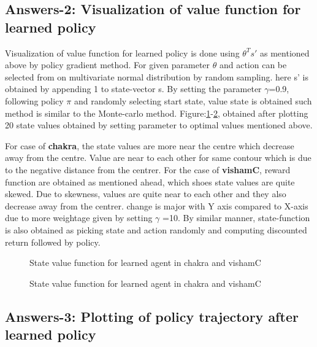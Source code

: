 \documentclass[preprint,12pt]{elsarticle}
\begin{document}
 \subsection{Answers-2: Visualization of value function for learned policy}
Visualization of value function for learned policy is done using $\theta^T s'$ as mentioned above by policy gradient method. For given parameter $\theta$ and action can be selected from on multivariate normal distribution by random sampling. here s' is obtained by appending 1 to state-vector s. By setting the parameter $\gamma$=0.9, following policy $\pi$ and randomly selecting start state, value state is obtained such method is similar to the Monte-carlo method. Figure:\ref{fig:Pstate1}-\ref{fig:Pstate2}, obtained after plotting 20 state values obtained by setting parameter to optimal values mentioned above.

For case of \textbf{chakra}, the state values are more near the centre which decrease away from the centre. Value are near to each other for same contour which is due to the negative distance from the centrer. For the case of \textbf{vishamC}, reward function are obtained as mentioned ahead, which shoes state values are quite skewed. Due to skewness, values are quite near to each other and they also decrease away from the centrer. change is major with Y axis compared to X-axis due to more weightage given by setting $\gamma$ =10. By similar manner, state-function is also obtained as picking state and action randomly and computing discounted return followed by policy.

  \begin{figure}[H]
  	\centering  
  	\caption{State value function for learned agent in chakra and vishamC}
  	\label{fig:Pstate1}
  \end{figure}
 
  \begin{figure}[H]
  	\centering  
  	\caption{State value function for learned agent in chakra and vishamC}
  	\label{fig:Pstate2}
  \end{figure}
	
 \subsection{Answers-3: Plotting of policy trajectory after learned policy}
\end{document}

